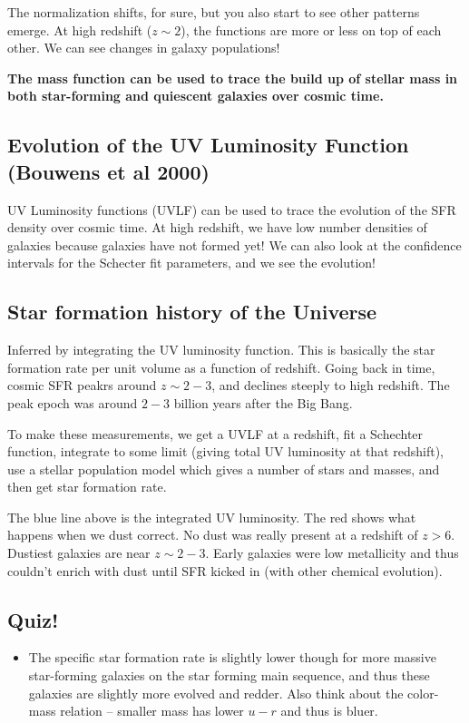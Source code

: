 \documentclass{article}
\begin{document}
The normalization shifts, for sure, but you also start to see other patterns emerge. At high redshift ($z\sim2$), the functions are more or less on top of each other. We can see changes in galaxy populations!

\textbf{The mass function can be used to trace the build up of stellar mass in both star-forming and quiescent galaxies over cosmic time.}

\subsection{Evolution of the UV Luminosity Function (Bouwens et al 2000)}

UV Luminosity functions (UVLF) can be used to trace the evolution of the SFR density over cosmic time. At high redshift, we have low number densities of galaxies because galaxies have not formed yet! We can also look at the confidence intervals for the Schecter fit parameters, and we see the evolution!


\subsection{Star formation history of the Universe}

Inferred by integrating the UV luminosity function. This is basically the star formation rate per unit volume as a function of redshift. Going back in time, cosmic SFR peakrs around $z\sim2-3$, and declines steeply to high redshift. The peak epoch was around $2-3$ billion years after the Big Bang.

To make these measurements, we get a UVLF at a redshift, fit a Schechter function, integrate to some limit (giving total UV luminosity at that redshift), use a stellar population model which gives a number of stars and masses, and then get star formation rate. 

The blue line above is the integrated UV luminosity. The red shows what happens when we dust correct. No dust was really present at a redshift of $z>6$. Dustiest galaxies are near $z\sim 2-3$. Early galaxies were low metallicity and thus couldn't enrich with dust until SFR kicked in (with other chemical evolution). 

\subsection{Quiz!}

\begin{itemize}
    \item The specific star formation rate is slightly lower though for more massive star-forming galaxies on the star forming main sequence, and thus these galaxies are slightly more evolved and redder. Also think about the color-mass relation -- smaller mass has lower $u-r$ and thus is bluer. 
\end{itemize}
\end{document}
